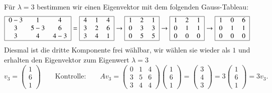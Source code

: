 Für $\lambda = 3$ bestimmen wir einen Eigenvektor mit dem folgenden
Gauss-Tableau:
\begin{align*}
\begin{tabular}{|>{$}c<{$}>{$}c<{$}>{$}c<{$}|}
\hline
0-3&1&4\\
3&5-3&6\\
3&4&4-3\\
\hline
\end{tabular}
&=
\begin{tabular}{|>{$}c<{$}>{$}c<{$}>{$}c<{$}|}
\hline
4&1&4\\
3&2&6\\
3&4&1\\
\hline
\end{tabular}
\rightarrow
\begin{tabular}{|>{$}c<{$}>{$}c<{$}>{$}c<{$}|}
\hline
1&2&1\\
0&3&3\\
0&5&5\\
\hline
\end{tabular}
\rightarrow
\begin{tabular}{|>{$}c<{$}>{$}c<{$}>{$}c<{$}|}
\hline
1&2&1\\
0&1&1\\
0&0&0\\
\hline
\end{tabular}
\rightarrow
\begin{tabular}{|>{$}c<{$}>{$}c<{$}>{$}c<{$}|}
\hline
1&0&6\\
0&1&1\\
0&0&0\\
\hline
\end{tabular}
\end{align*}
Diesmal ist die dritte Komponente frei wählbar, wir wählen sie wieder als
$1$ und erhalten den Eigenvektor zum Eigenwert $\lambda=3$
\[
v_3=\begin{pmatrix}1\\6\\1\end{pmatrix}
\qquad\text{Kontrolle:}\qquad
Av_3
=
\begin{pmatrix}
0&1&4\\
3&5&6\\
3&4&4
\end{pmatrix}
\begin{pmatrix}1\\6\\1\end{pmatrix}
=
\begin{pmatrix}3\\4\\3\end{pmatrix}
=
3\begin{pmatrix}1\\6\\1\end{pmatrix}
=
3v_3.
\]

